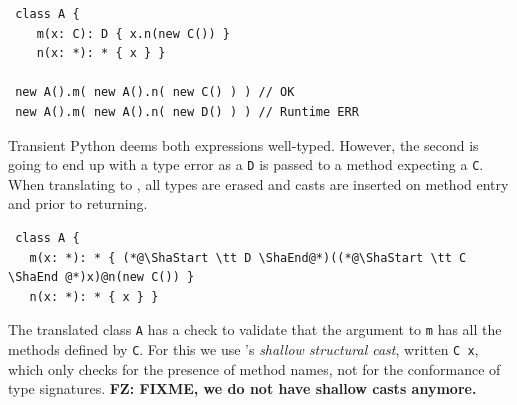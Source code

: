 \documentclass[acmlarge, anonymous, authordraft]{acmart}
\newcommand{\code}[1]{{\tt #1}\xspace}
\newcommand{\FZ}[1]{\textbf{FZ: #1}}
\begin{document}
\begin{lstlisting}
 class A {
    m(x: C): D { x.n(new C()) }
    n(x: *): * { x } }

 new A().m( new A().n( new C() ) ) // OK
 new A().m( new A().n( new D() ) ) // Runtime ERR
\end{lstlisting}

\noindent Transient Python deems both expressions well-typed. However, the
second is going to end up with a type error as a \code D is passed to a method
expecting a \code C.  When translating to \kafka, all types are erased and casts
are inserted on method entry and prior to returning.

\begin{lstlisting}
 class A {
   m(x: *): * { (*@\ShaStart \tt D \ShaEnd@*)((*@\ShaStart \tt C \ShaEnd @*)x)@n(new C()) }
   n(x: *): * { x } }
\end{lstlisting}

\noindent The translated class \code A has a check to validate that the
argument to \code m has all the methods defined by \code C. For this we use
\kafka's \emph{shallow structural cast}, written {\ShaStart \tt C \ShaEnd
  x}, which only checks for the presence of method names, not for the
conformance of type signatures.  \FZ{FIXME, we do not have shallow casts anymore.}
\end{document}
